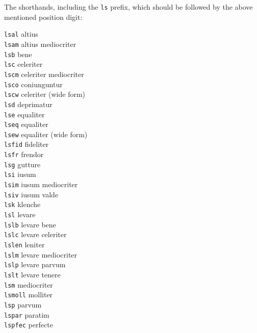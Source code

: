 \documentclass[a4paper]{article}
\begin{document}
{The shorthands, including the \texttt{ls} prefix, which should be followed
by the above mentioned position digit:
\begin{multicols}{3}
\texttt{lsal}  altius\\
\texttt{lsam}  altius mediocriter\\
\texttt{lsb}  bene\\
\texttt{lsc}  celeriter\\
\texttt{lscm}  celeriter mediocriter\\
\texttt{lsco}  coniunguntur\\
\texttt{lscw}  celeriter (wide form)\\
\texttt{lsd}  deprimatur\\
\texttt{lse}  equaliter\\
\texttt{lseq}  equaliter\\
\texttt{lsew}  equaliter (wide form)\\
\texttt{lsfid}  fideliter\\
\texttt{lsfr}  frendor\\
\texttt{lsg}  gutture\\
\texttt{lsi}  iusum\\
\texttt{lsim}  iusum mediocriter\\
\texttt{lsiv}  iusum valde\\
\texttt{lsk}  klenche\\
\texttt{lsl}  levare\\
\texttt{lslb}  levare bene\\
\texttt{lslc}  levare celeriter\\
\texttt{lslen}  leniter\\
\texttt{lslm}  levare mediocriter\\
\texttt{lslp}  levare parvum\\
\texttt{lslt}  levare tenere\\
\texttt{lsm}  mediocriter\\
\texttt{lsmoll}  molliter\\
\texttt{lsp}  parvum\\
\texttt{lspar}  paratim\\
\texttt{lspfec}  perfecte\\

\end{multicols}}
\end{document}
